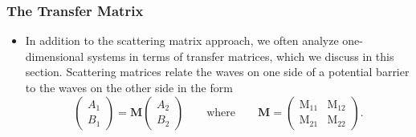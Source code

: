 \documentclass[11pt, a4paper]{article}
\newcommand{\mat}[1]{\mathbf{#1}}  %
\newcommand{\M}{\mat{M}}  %
\newcommand{\MM}{\mathrm{M}}  %
\begin{document}
\subsubsection{The Transfer Matrix}
\begin{itemize}
    \item In addition to the scattering matrix approach, we often analyze one-dimensional systems in terms of transfer matrices, which we discuss in this section. Scattering matrices relate the waves on one side of a potential barrier to the waves on the other side in the form
    \begin{equation*}
        \begin{pmatrix}
            A_{1}\\
            B_{1}
        \end{pmatrix}
        = \M
        \begin{pmatrix}
            A_{2}\\
            B_{2}
        \end{pmatrix}
        \qquad \text{where} \qquad \M = 
        \begin{pmatrix}
            \MM_{11} & \MM_{12}\\
            \MM_{21} & \MM_{22}
        \end{pmatrix}.
    \end{equation*}
    

\end{itemize}
\end{document}
